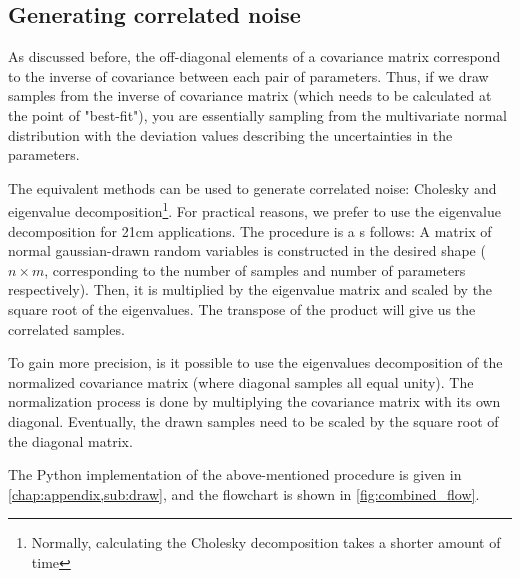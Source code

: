 \documentclass[12pt, TexShade, letterpaper]{report}
\begin{document}
\subsection{Generating correlated noise}
\label{chap:method,sub:correlated noise}
As discussed before, the off-diagonal elements of a covariance matrix correspond to the inverse of covariance between each pair of parameters. Thus, if we draw samples from the inverse of covariance matrix (which needs to be calculated at the point of "best-fit"), you are essentially sampling from the multivariate normal distribution with the deviation values describing the uncertainties in the parameters.\par
The equivalent methods can be used to generate correlated noise: Cholesky and eigenvalue decomposition\footnote{Normally, calculating the Cholesky decomposition takes a shorter amount of time}. For practical reasons, we prefer to use the eigenvalue decomposition for 21cm applications. The procedure is a s follows: A matrix of normal gaussian-drawn random variables is constructed in the desired shape ($n \times m$, corresponding to the number of samples and number of parameters respectively). Then, it is multiplied by the eigenvalue matrix and scaled by the square root of the eigenvalues. The transpose of the product will give us the correlated samples. \par
To gain more precision, is it possible to use the eigenvalues decomposition of the normalized covariance matrix (where diagonal samples all equal unity). The normalization process is done by multiplying the covariance matrix with its own diagonal. Eventually, the drawn samples need to be scaled by the square root of the diagonal matrix.\par
The Python implementation of the above-mentioned procedure is given in \ref{chap:appendix,sub:draw}, and the flowchart is shown in \ref{fig:combined_flow}.
\end{document}
